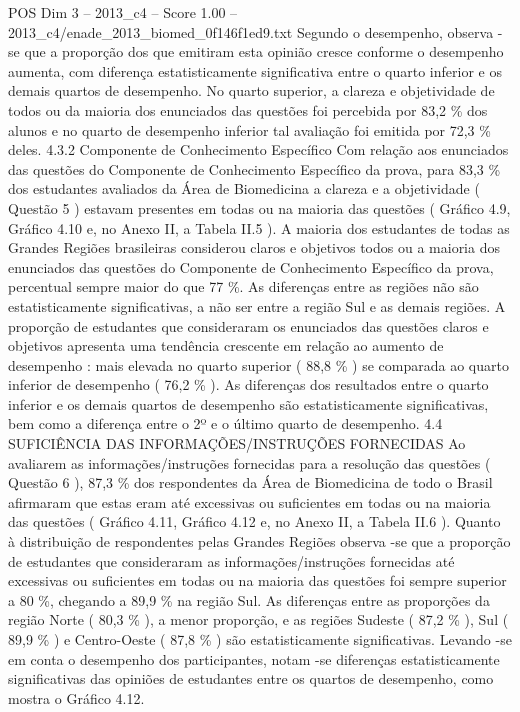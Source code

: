 \begin{textsample}{POS Dim 3 – 2013\_c4 – Score 1.00 – 2013\_c4/enade\_2013\_biomed\_0f146f1ed9.txt}
Segundo o desempenho, observa -se que a proporção dos que emitiram esta opinião cresce conforme o desempenho aumenta, com diferença estatisticamente significativa entre o quarto inferior e os demais quartos de desempenho.
No quarto superior, a clareza e objetividade de todos ou da maioria dos enunciados das questões foi percebida por 83,2 \% dos alunos e no quarto de desempenho inferior tal avaliação foi emitida por 72,3 \% deles. 4.3.2 Componente de Conhecimento Específico Com relação aos enunciados das questões do Componente de Conhecimento Específico da prova, para 83,3 \% dos estudantes avaliados da Área de Biomedicina a clareza e a objetividade ( Questão 5 ) estavam presentes em todas ou na maioria das questões ( Gráfico 4.9, Gráfico 4.10 e, no Anexo II, a Tabela II.5 ).
A maioria dos estudantes de todas as Grandes Regiões brasileiras considerou claros e objetivos todos ou a maioria dos enunciados das questões do Componente de Conhecimento Específico da prova, percentual sempre maior do que 77 \%.
As diferenças entre as regiões não são estatisticamente significativas, a não ser entre a região Sul e as demais regiões.
A proporção de estudantes que consideraram os enunciados das questões claros e objetivos apresenta uma tendência crescente em relação ao aumento de desempenho : mais elevada no quarto superior ( 88,8 \% ) se comparada ao quarto inferior de desempenho ( 76,2 \% ).
As diferenças dos resultados entre o quarto inferior e os demais quartos de desempenho são estatisticamente significativas, bem como a diferença entre o 2º e o último quarto de desempenho. 4.4 SUFICIÊNCIA DAS INFORMAÇÕES/INSTRUÇÕES FORNECIDAS Ao avaliarem as informações/instruções fornecidas para a resolução das questões ( Questão 6 ), 87,3 \% dos respondentes da Área de Biomedicina de todo o Brasil afirmaram que estas eram até excessivas ou suficientes em todas ou na maioria das questões ( Gráfico 4.11, Gráfico 4.12 e, no Anexo II, a Tabela II.6 ).
Quanto à distribuição de respondentes pelas Grandes Regiões observa -se que a proporção de estudantes que consideraram as informações/instruções fornecidas até excessivas ou suficientes em todas ou na maioria das questões foi sempre superior a 80 \%, chegando a 89,9 \% na região Sul.
As diferenças entre as proporções da região Norte ( 80,3 \% ), a menor proporção, e as regiões Sudeste ( 87,2 \% ), Sul ( 89,9 \% ) e Centro-Oeste ( 87,8 \% ) são estatisticamente significativas.
Levando -se em conta o desempenho dos participantes, notam -se diferenças estatisticamente significativas das opiniões de estudantes entre os quartos de desempenho, como mostra o Gráfico 4.12.

\end{textsample}
